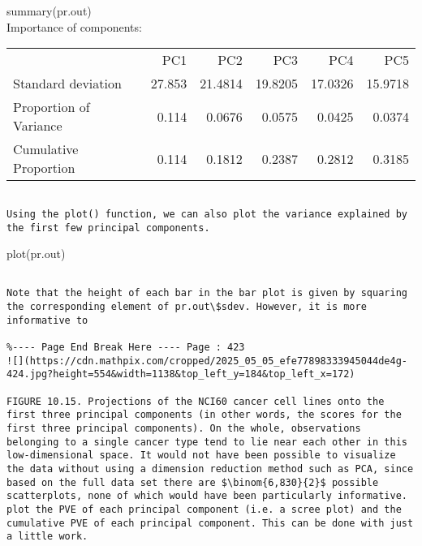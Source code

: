 \documentclass[10pt]{article}
\begin{document}
\begin{displayquote}
summary(pr.out)\\
Importance of components:
\end{displayquote}

\begin{center}
\begin{tabular}{lrrrrr}
 & PC1 & PC2 & PC3 & PC4 & PC5 \\
Standard deviation & 27.853 & 21.4814 & 19.8205 & 17.0326 & 15.9718 \\
Proportion of Variance & 0.114 & 0.0676 & 0.0575 & 0.0425 & 0.0374 \\
Cumulative Proportion & 0.114 & 0.1812 & 0.2387 & 0.2812 & 0.3185 \\
\end{tabular}
\end{center}

\begin{verbatim}

Using the plot() function, we can also plot the variance explained by the first few principal components.
\end{verbatim}

\begin{displayquote}
plot(pr.out)
\end{displayquote}

\begin{verbatim}

Note that the height of each bar in the bar plot is given by squaring the corresponding element of pr.out\$sdev. However, it is more informative to

%---- Page End Break Here ---- Page : 423
![](https://cdn.mathpix.com/cropped/2025_05_05_efe77898333945044de4g-424.jpg?height=554&width=1138&top_left_y=184&top_left_x=172)

FIGURE 10.15. Projections of the NCI60 cancer cell lines onto the first three principal components (in other words, the scores for the first three principal components). On the whole, observations belonging to a single cancer type tend to lie near each other in this low-dimensional space. It would not have been possible to visualize the data without using a dimension reduction method such as PCA, since based on the full data set there are $\binom{6,830}{2}$ possible scatterplots, none of which would have been particularly informative.
plot the PVE of each principal component (i.e. a scree plot) and the cumulative PVE of each principal component. This can be done with just a little work.
\end{verbatim}
\end{document}
